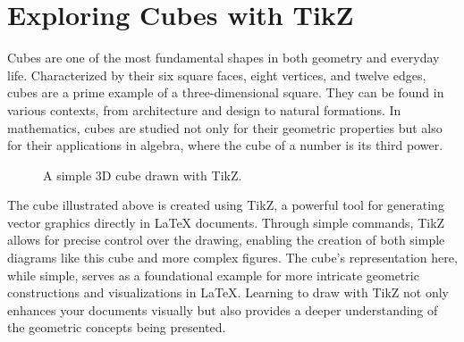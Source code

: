 \section{Exploring Cubes with TikZ}

Cubes are one of the most fundamental shapes in both geometry and everyday life. Characterized by their six square faces, eight vertices, and twelve edges, cubes are a prime example of a three-dimensional square. They can be found in various contexts, from architecture and design to natural formations. In mathematics, cubes are studied not only for their geometric properties but also for their applications in algebra, where the cube of a number is its third power.

\begin{figure}[ht]
\centering %
\caption{A simple 3D cube drawn with TikZ.} %
\label{fig:3dcube} %
\end{figure}

The cube illustrated above is created using TikZ, a powerful tool for generating vector graphics directly in LaTeX documents. Through simple commands, TikZ allows for precise control over the drawing, enabling the creation of both simple diagrams like this cube and more complex figures. The cube's representation here, while simple, serves as a foundational example for more intricate geometric constructions and visualizations in LaTeX. Learning to draw with TikZ not only enhances your documents visually but also provides a deeper understanding of the geometric concepts being presented.
